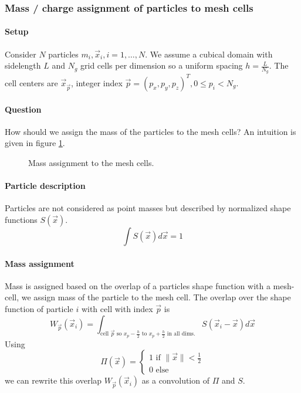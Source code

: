 \subsubsection{Mass / charge assignment of particles to mesh cells}
\paragraph*{Setup} Consider $N$ particles $m_i, \vec{x}_i, i = 1,\dots,N$. We
assume a cubical domain with sidelength $L$ and $N_g$ grid cells per dimension
so a uniform spacing $h = \frac{L}{N_g}$. The cell centers are ${\vec{x}_\vec{p}}$,
integer index $\vec{p} = (p_x,p_y,p_z)^T, 0 \leq p_i < N_g$.

\paragraph{Question} How should we assign the mass of the particles to the mesh cells?
An intuition is given in figure \ref{fig:pic}.
\begin{figure}[H]
    \centering
    
    \caption{Mass assignment to the mesh cells.}
    \label{fig:pic}
\end{figure}

\paragraph*{Particle description} \textcolor{blue1}{Particles are not considered as point masses but described
by normalized shape functions $S(\vec{x})$}.
\begin{equation}
    \int S(\vec{x}) d\vec{x} = 1
\end{equation}

\paragraph*{Mass assignment} Mass is assigned based on the overlap of a particles
shape function with a mesh-cell, we assign mass of the particle to the mesh cell.
The overlap over the shape function of particle $i$ with cell with index $\vec{p}$ is
\begin{equation}
    W_\vec{p}(\vec{x}_i) = \int_{\text{cell } \vec{p} \text{ so } x_p - \frac{h}{2} \text{ to } x_p + \frac{h}{2} \text{ in all dims.}} S(\vec{x}_i - \vec{x}) d\vec{x}
\end{equation}
Using
\begin{equation}
    \Pi(\vec{x})=\left\{\begin{array}{c}
    1 \text { if }\|\vec{x}\|<\frac{1}{2} \\
    0 \text { else }
    \end{array}\right.
\end{equation}
we can rewrite this overlap $W_\vec{p}(\vec{x}_i)$ as a convolution of $\Pi$ and $S$.


